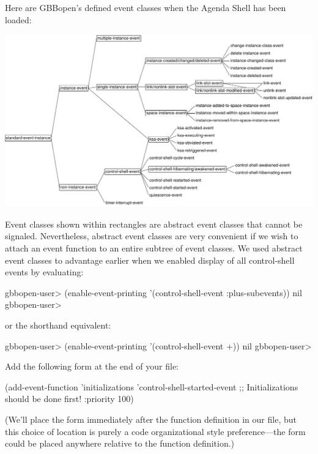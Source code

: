 \documentclass[10pt,twoside,english,pdftex]{article}
\begin{document}
Here are GBBopen's defined event classes when the Agenda Shell has
been loaded:
%
\T\begin{ifhtml}
\T\end{ifhtml}
\W\begin{iftex} 
\begin{center}
\includegraphics[scale=0.85]{agenda-shell-events}
\end{center}
\W\end{iftex}
%
Event classes shown within rectangles are abstract event classes that cannot
be signaled.  Nevertheless, abstract event classes are very convenient if we
wish to attach an event function to an entire subtree of event classes.  We
used abstract event classes to advantage earlier when we enabled display of
all control-shell events by evaluating:
%
\W\supp
\begin{example}
\textcolor{darkergray}{%
  gbbopen-user> (enable-event-printing '(control-shell-event :plus-subevents))
  nil
  gbbopen-user>}
\end{example}
%
or the shorthand equivalent:
%
\W\supp\notpretop
\begin{example}
\textcolor{darkergray}{%
  gbbopen-user> (enable-event-printing '(control-shell-event +))
  nil
  gbbopen-user>}
\end{example}

Add the following form at the end of your 
file:
%
\W\supp
\begin{example}
  (add-event-function 'initializations 'control-shell-started-event
                      ;; Initializations should be done first!
                      :priority 100)
\end{example}
%
(We'll place the  form immediately after the
 function definition in our file, but this choice
of location is purely a code organizational style preference---the form could
be placed anywhere relative to the function definition.)
\end{document}
